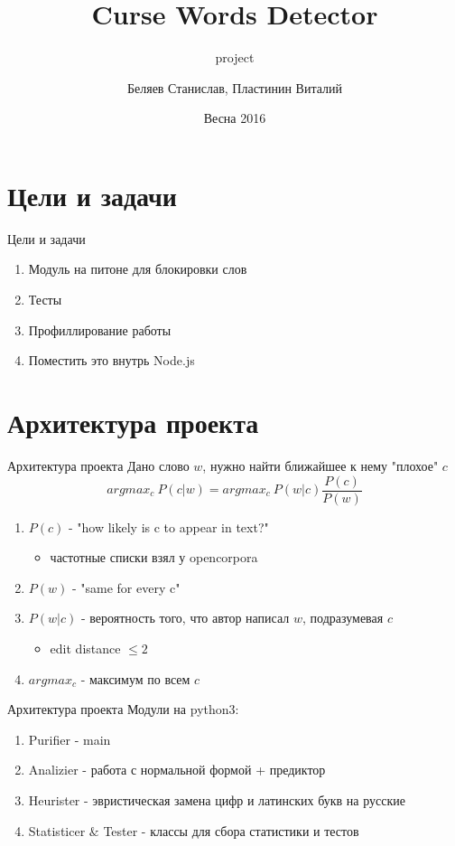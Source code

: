 \documentclass{beamer}
\title{Curse Words Detector}
\subtitle{project}
\author{Беляев Станислав, Пластинин Виталий}
\institute{СПб АУ РАН}
\date{Весна 2016}
\begin{document}
\frame{\titlepage}

\section{Цели и задачи}
\begin{frame}[<+->]{Цели и задачи}
    \begin{enumerate}
        \item Модуль на питоне для блокировки слов
        \item Тесты
        \item Профиллирование работы
        \item Поместить это внутрь Node.js
    \end{enumerate}
\end{frame}

\section{Архитектура проекта}
\begin{frame}[t]{Архитектура проекта}
    Дано слово $w$, нужно найти ближайшее к нему "плохое" $c$
    $$argmax_c ~ {P(c|w)} = argmax_c ~ {P(w|c) \frac{P(c)}{P(w)}}$$
    \begin{enumerate}
        \item $P(c)$ - "how likely is c to appear in text?"
            \begin{itemize}
                \item частотные списки взял у opencorpora
            \end{itemize}
        \item $P(w)$ - "same for every c"
        \item $P(w|c)$ - вероятность того, что автор написал $w$, подразумевая $c$
            \begin{itemize}
                \item edit distance $\leqslant 2$
            \end{itemize}
        \item $argmax_c$ - максимум по всем $c$
    \end{enumerate}
\end{frame}
\begin{frame}[t]{Архитектура проекта}
    Модули на python3:
    \begin{enumerate}
        \item Purifier - main
        \item Analizier - работа с нормальной формой + предиктор
        \item Heurister - эвристическая замена цифр и латинских букв на русские
        \item Statisticer $\&$ Tester - классы для сбора статистики и тестов
    \end{enumerate}
\end{frame}
\end{document}
